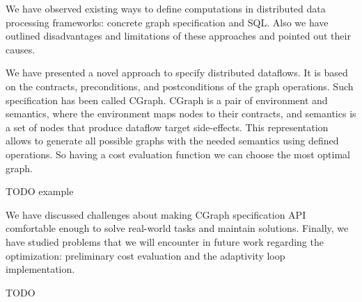 We have observed existing ways to define computations in distributed data processing frameworks: concrete graph specification and SQL.
Also we have outlined disadvantages and limitations of these approaches and pointed out their causes.

We have presented a novel approach to specify distributed dataflows.
It is based on the contracts, preconditions, and postconditions of the graph operations.
Such specification has been called CGraph.
CGraph is a pair of environment and semantics, where the environment maps nodes to their contracts, and semantics is a set of nodes that produce dataflow target side-effects.
This representation allows to generate all possible graphs with the needed semantics using defined operations.
So having a cost evaluation function we can choose the most optimal graph.

TODO example

We have discussed challenges about making CGraph specification API comfortable enough to solve real-world tasks and maintain solutions.
Finally, we have studied problems that we will encounter in future work regarding the optimization: preliminary cost evaluation and the adaptivity loop implementation.

TODO
